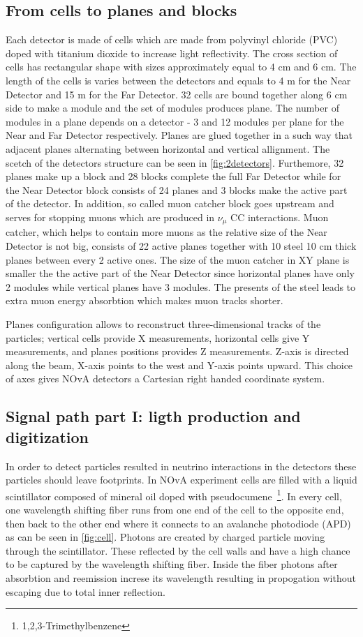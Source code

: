 \subsection{From cells to planes and blocks}
Each detector is made of cells which are made from polyvinyl chloride (PVC) doped with titanium 
dioxide to increase light reflectivity. The cross section of cells has rectangular shape with sizes
approximately equal to 4 cm and 6 cm. The length of the cells is varies between the detectors and 
equals to 4 m for the Near Detector and 15 m for the Far Detector. 32 cells are bound together along
6 cm side to make a module and the set of modules produces plane. The number of modules in a plane
depends on a detector - 3 and 12 modules per plane for the Near and Far Detector respectively. Planes
are glued together in a such way that adjacent planes alternating between horizontal and vertical
allignment. The scetch of the detectors structure can be seen in \ref{fig:2detectors}. Furthemore, 32 planes 
make up a block and 28 blocks complete the full Far Detector while for the Near Detector block consists
of 24 planes and 3 blocks make the active part of the detector. In addition, so called muon catcher
block goes upstream and serves for stopping muons which are produced in $\nu_\mu$ CC interactions. 
Muon catcher, which helps to contain more muons as the relative size of the Near Detector is not big, 
consists of 22 active planes together with 10 steel 10 cm thick planes between every 2 active ones. The size
of the muon catcher in XY plane is smaller the the active part of the Near Detector since horizontal
planes have only 2 modules while vertical planes have 3 modules. The presents of the steel leads to
extra muon energy absorbtion which makes muon tracks shorter.

Planes configuration allows to reconstruct three-dimensional tracks of the particles; vertical cells 
provide X measurements, horizontal cells give Y measurements, and planes positions provides Z measurements. 
Z-axis is directed along the beam, X-axis points to the west and Y-axis points upward. This choice of
axes gives NOvA detectors a Cartesian right handed coordinate system. 

\subsection{Signal path part I: ligth production and digitization}
In order to detect particles resulted in neutrino interactions in the detectors these particles 
should leave footprints. In NOvA experiment cells are filled with a liquid scintillator composed 
of mineral oil doped with pseudocumene~\footnote{1,2,3-Trimethylbenzene}. In every cell, one wavelength 
shifting fiber runs from one end of the cell to the opposite end, then back to the other end where 
it connects to an avalanche photodiode (APD) as can be seen in \ref{fig:cell}. Photons are created by charged 
particle moving through the scintillator. These reflected by the cell walls and have a high chance 
to be captured by the wavelength shifting fiber. Inside the fiber photons after absorbtion and
reemission increse its wavelength resulting in propogation without escaping due to total inner
reflection. 

